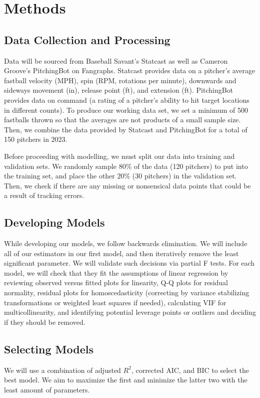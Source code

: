 \documentclass[12pt]{article}
\begin{document}
\section{Methods}
\subsection{Data Collection and Processing}
Data will be sourced from Baseball Savant's Statcast as well as Cameron Groove's PitchingBot on Fangraphs. Statcast provides data on a pitcher's average fastball velocity (MPH), spin (RPM, rotations per minute), downwards and sideways movement (in), release point (ft), and extension (ft). PitchingBot provides data on command (a rating of a pitcher's ability to hit target locations in different counts). To produce our working data set, we set a minimum of 500 fastballs thrown so that the averages are not products of a small sample size. Then, we combine the data provided by Statcast and PitchingBot for a total of 150 pitchers in 2023. 

\medskip

Before proceeding with modelling, we must split our data into training and validation sets. We randomly sample $80$\% of the data (120 pitchers) to put into the training set, and place the other $20$\% (30 pitchers) in the validation set. Then, we check if there are any missing or nonsensical data points that could be a result of tracking errors.

\subsection{Developing Models}
While developing our models, we follow backwards elimination. We will include all of our estimators in our first model, and then iteratively remove the least significant parameter. We will validate such decisions via partial F tests. For each model, we will check that they fit the assumptions of linear regression by reviewing observed versus fitted plots for linearity, Q-Q plots for residual normality, residual plots for homoscedasticity (correcting by variance stabilizing transformations or weighted least squares if needed), calculating VIF for multicollinearity, and identifying potential leverage points or outliers and deciding if they should be removed.

\subsection{Selecting Models}
We will use a combination of adjusted $R^2$, corrected AIC, and BIC to select the best model. We aim to maximize the first and minimize the latter two with the least amount of parameters.
\end{document}
